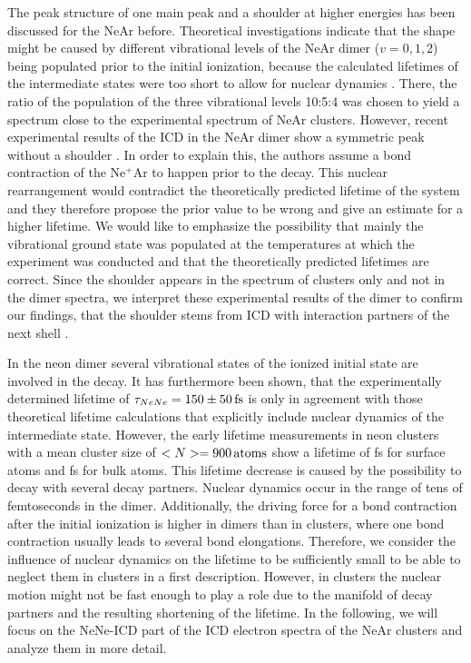 The peak structure of one main peak and a shoulder at higher energies has been
discussed for the NeAr before. Theoretical investigations indicate that the
shape might be caused by different vibrational levels of the NeAr dimer
($v=0,1,2$) being populated prior to the initial ionization, because
the calculated lifetimes of the intermediate states were too short to allow
for nuclear dynamics \cite{Scheit06}.
There, the ratio of the population of the three vibrational levels 10:5:4
was chosen to yield a spectrum close to the experimental spectrum of NeAr
clusters.
However,
recent experimental results of the ICD in the NeAr dimer show a symmetric peak
without a shoulder \cite{OKeeffe14}. In order to explain this, the authors assume
a bond contraction of the Ne$^+$Ar to happen prior to the decay.
This nuclear rearrangement would contradict the
theoretically predicted lifetime of the system and they therefore propose
the prior value to be wrong and give an estimate for a higher lifetime.
We would like to emphasize the possibility that mainly the vibrational
ground state was populated at the temperatures at which the
experiment was conducted and that the theoretically predicted lifetimes are
correct.
Since the shoulder appears in the spectrum of clusters only and not in the
dimer spectra, we interpret these experimental results of the dimer to confirm our
findings, that the shoulder stems from ICD with interaction partners of the
next shell \cite{Fasshauer14_1}.

In the neon dimer several vibrational states of the ionized initial state are
involved in the decay. \cite{Santra00_1} It has furthermore been shown, that
the experimentally determined lifetime of $\tau_{NeNe}=\unit[150\pm 50]{fs}$
\cite{Schnorr13} is only in agreement with those theoretical lifetime
calculations that explicitly include nuclear dynamics of the intermediate state.
\cite{Schnorr15} However, the early lifetime measurements in neon clusters with
a mean cluster size of $<N>=\unit[900]{atoms}$ show a lifetime of
\unit[30]{fs} for surface atoms and \unit[6]{fs} for bulk atoms. This lifetime
decrease is caused by the possibility to decay with several decay partners.
Nuclear dynamics occur in the range of tens of femtoseconds in the dimer.
Additionally, the driving force for a bond contraction after the initial
ionization is higher in dimers than in clusters, where one bond contraction
usually leads to several bond elongations. Therefore, we consider the influence
of nuclear dynamics on the lifetime to be sufficiently small to be able to
neglect them in clusters in a first description.
\cite{Santra01_3,Ohrwall04}
However, in clusters the nuclear
motion might not be fast enough to play a role due to the manifold of
decay partners and the resulting shortening of the lifetime.
In the following, we will focus on the NeNe-ICD part of the
ICD electron spectra of the NeAr clusters and analyze them in more detail.

